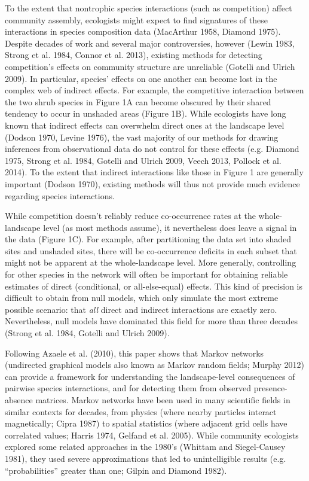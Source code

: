 \documentclass[12pt,]{article}
\begin{document}
\begin{spacing}{1.9}
\begin{flushleft}
To the extent that nontrophic species interactions (such as competition)
affect community assembly, ecologists might expect to find signatures of
these interactions in species composition data (MacArthur 1958, Diamond
1975). Despite decades of work and several major controversies, however
(Lewin 1983, Strong et al. 1984, Connor et al. 2013), existing methods
for detecting competition's effects on community structure are
unreliable (Gotelli and Ulrich 2009). In particular, species' effects on
one another can become lost in the complex web of indirect effects. For
example, the competitive interaction between the two shrub species in
Figure 1A can become obscured by their shared tendency to occur in
unshaded areas (Figure 1B). While ecologists have long known that
indirect effects can overwhelm direct ones at the landscape level
(Dodson 1970, Levine 1976), the vast majority of our methods for drawing
inferences from observational data do not control for these effects
(e.g. Diamond 1975, Strong et al. 1984, Gotelli and Ulrich 2009, Veech
2013, Pollock et al. 2014). To the extent that indirect interactions
like those in Figure 1 are generally important (Dodson 1970), existing
methods will thus not provide much evidence regarding species
interactions.

While competition doesn't reliably reduce co-occurrence rates at the
whole-landscape level (as most methods assume), it nevertheless does
leave a signal in the data (Figure 1C). For example, after partitioning
the data set into shaded sites and unshaded sites, there will be
co-occurrence deficits in each subset that might not be apparent at the
whole-landscape level. More generally, controlling for other species in
the network will often be important for obtaining reliable estimates of
direct (conditional, or all-else-equal) effects. This kind of precision
is difficult to obtain from null models, which only simulate the most
extreme possible scenario: that \emph{all} direct and indirect
interactions are exactly zero. Nevertheless, null models have dominated
this field for more than three decades (Strong et al. 1984, Gotelli and
Ulrich 2009).

Following Azaele et al. (2010), this paper shows that Markov networks
(undirected graphical models also known as Markov random fields; Murphy
2012) can provide a framework for understanding the landscape-level
consequences of pairwise species interactions, and for detecting them
from observed presence-absence matrices. Markov networks have been used
in many scientific fields in similar contexts for decades, from physics
(where nearby particles interact magnetically; Cipra 1987) to spatial
statistics (where adjacent grid cells have correlated values; Harris
1974, Gelfand et al. 2005). While community ecologists explored some
related approaches in the 1980's (Whittam and Siegel-Causey 1981), they
used severe approximations that led to unintelligible results (e.g.
``probabilities'' greater than one; Gilpin and Diamond 1982).


\end{flushleft}
\end{spacing}
\end{document}
